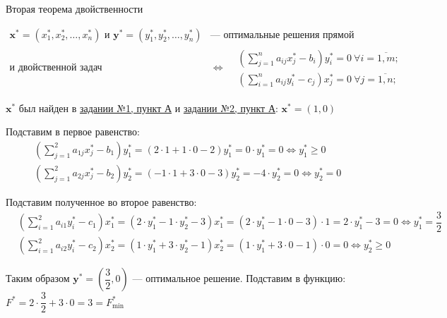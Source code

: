 \begin{Th}{Вторая теорема двойственности}\end{Th}

\begin{align*}
    \mathbf{x^{ *}} = (x_{ 1}^{ *} , x_{ 2}^{ *} , \dots , x_{ n}^{ *}) \text{ и } \mathbf{y^{ *}} = (y_{ 1}^{ *} , y_{ 2}^{ *} , \dots , y_{ n}^{ *}) &\text{--- оптимальные решения прямой}\\
    \text{и двойственной задач}
    &\Leftrightarrow
    \begin{aligned}
        &\left(\sum_{j = 1}^{n} a_{ ij} x_{ j}^{ *} - b_{ i}\right)y_{ i}^{ *} = 0 \ \forall i = \overline{1, m}; \\
        &\left(\sum_{i=1}^{n} a_{ ij} y_{ i}^{ *} - c_{ j}\right)x_{ j}^{ *} = 0 \ \forall j = \overline{1, n}; 
    \end{aligned}
\end{align*}

$ \mathbf{x^{ *}} $ был найден в \hyperref[01-lab-a-answer]{задании №1, пункт А} и \hyperref[02-lab-a-answer]{задании №2, пункт А}: $ \mathbf{x^{ *}} = \left(1, 0\right) $

Подставим в первое равенство:
\begin{align*}
    &\left(\sum_{j=1}^{2} a_{ 1j}x_{j}^{ *} - b_{ 1}\right)y_{ 1}^{ *}   =  \left(2\cdot1 + 1 \cdot 0 - 2\right)y_{ 1}^{ *} = 0 \cdot y_1^*  = 0 \Leftrightarrow y_1^* \geq 0\\
    &\left(\sum_{j=1}^{2} a_{ 2j}x_{j}^{ *} - b_{ 2}\right)y_{ 2}^{ *}   =   \left(-1 \cdot 1 + 3 \cdot 0 - 3\right)y_2^* = -4 \cdot y_2^* = 0 \Leftrightarrow y_2^* = 0
\end{align*}

Подставим полученное во второе равенство:
\begin{align*}
    &   \left(\sum_{i=1}^{2} a_{ i1} y_{ i}^{ *} - c_{ 1}\right)x_{ 1}^{ *} = \left(2 \cdot y_1^* - 1 \cdot y_2^* - 3\right)x_1^* = \left(2 \cdot y_1^* - 1 \cdot 0 - 3\right) \cdot 1 = 2 \cdot y_1^* - 3 = 0 \Leftrightarrow y_1^* = \dfrac{ 3}{ 2}   \\
    &   \left(\sum_{i=1}^{2} a_{ i2} y_{ i}^{ *} - c_{ 2}\right)x_{ 2}^{ *} = \left(1 \cdot y_1^* + 3 \cdot y_2^* - 1\right)x_2^* = \left(1 \cdot y_1^* + 3 \cdot 0 - 1\right) \cdot 0 = 0 \Leftrightarrow y_2^* \geq 0
\end{align*}

Таким образом $ \mathbf{y^*} = \left( \dfrac{ 3}{ 2}, 0\right) $ --- оптимальное решение. Подставим в функцию: $ F^* = 2 \cdot \dfrac{ 3}{ 2} + 3 \cdot 0 = 3 = F_{ \min}^* $ 

